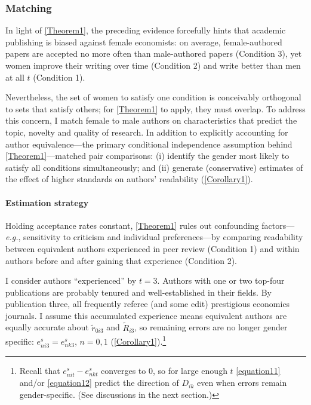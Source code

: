 \subsubsection{Matching}
\label{seumatching}

In light of \autoref{Theorem1}, the preceding evidence forcefully hints that academic publishing is biased against female economists: on average, female-authored papers are accepted no more often than male-authored papers (Condition 3), yet women improve their writing over time (Condition 2) and write better than men at all $t$ (Condition 1).

Nevertheless, the set of women to satisfy one condition is conceivably orthogonal to sets that satisfy others; for \autoref{Theorem1} to apply, they must overlap. To address this concern, I match female to male authors on characteristics that predict the topic, novelty and quality of research. In addition to explicitly accounting for author equivalence---the primary conditional independence assumption behind \autoref{Theorem1}---matched pair comparisons: (i) identify the gender most likely to satisfy all conditions simultaneously; and (ii) generate (conservative) estimates of the effect of higher standards on authors' readability (\autoref{Corollary1}).

\paragraph{Estimation strategy}
\label{matchingestimation}

Holding acceptance rates constant, \autoref{Theorem1} rules out confounding factors---\emph{e.g.}, sensitivity to criticism and individual preferences---by comparing readability between equivalent authors experienced in peer review (Condition 1) and within authors before and after gaining that experience (Condition 2).

I consider authors ``experienced'' by $t=3$. Authors with one or two top-four publications are probably tenured and well-established in their fields. By publication three, all frequently referee (and some edit) prestigious economics journals. I assume this accumulated experience means equivalent authors are equally accurate about $\widetilde r_{0i3}$ and $\widetilde R_{i3}$, so remaining errors are no longer gender specific: $e_{ni3}^s=e_{nk3}^s$, $n=0,1$ (\autoref{Corollary1}).\footnote{Recall that $e_{nit}^s-e_{nkt}^s$ converges to 0, so for large enough $t$ \autoref{equation11} and\slash or \autoref{equation12} predict the direction of $D_{ik}$ even when errors remain gender-specific. (See discussions in the next section.)}


